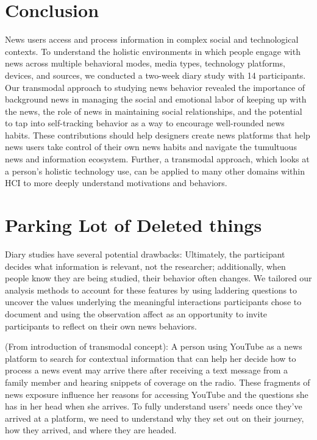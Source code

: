 \documentclass[sigchi]{acmart}
\begin{document}
\section{Conclusion}
News users access and process information in complex social and technological contexts. To understand the holistic environments in which people engage with news across multiple behavioral modes, media types, technology platforms, devices, and sources, we conducted a two-week diary study with 14 participants. Our transmodal approach to studying news behavior revealed the importance of background news in managing the social and emotional labor of keeping up with the news, the role of news in maintaining social relationships, and the potential to tap into self-tracking behavior as a way to encourage well-rounded news habits. These contributions should help designers create news platforms that help news users take control of their own news habits and navigate the tumultuous news and information ecosystem. Further, a transmodal approach, which looks at a person’s holistic technology use, can be applied to many other domains within HCI to more deeply understand motivations and behaviors.


\section{Parking Lot of Deleted things}
Diary studies have several potential drawbacks: Ultimately, the participant decides what information is relevant, not the researcher; additionally, when people know they are being studied, their behavior often changes. We tailored our analysis methods to account for these features by using laddering questions to uncover the values underlying the meaningful interactions participants chose to document and using the observation affect as an opportunity to invite participants to reflect on their own news behaviors.


(From introduction of transmodal concept):
A person using YouTube as a news platform to search for contextual information that can help her decide how to process a news event may arrive there after receiving a text message from a family member and hearing snippets of coverage on the radio. These fragments of news exposure influence her reasons for accessing YouTube and the questions she has in her head when she arrives. To fully understand users’ needs once they’ve arrived at a platform, we need to understand why they set out on their journey, how they arrived, and where they are headed. 
\end{document}
